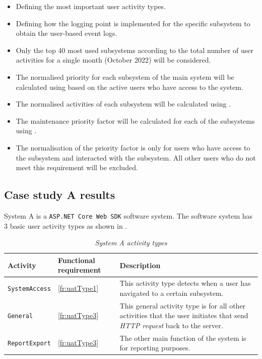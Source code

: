 \begin{itemize}
\item Defining the most important user activity types.
\item Defining how the logging point is implemented for the specific subsystem to obtain the user-based event logs.
\item Only the top 40 most used subsystems according to the total number of user activities for a single month (October 2022) will be considered.
\item The normalised priority for each subsystem of the main system will be calculated using  based on the active users who have access to the system.
\item The normalised activities of each subsystem will be calculated using .
\item The maintenance priority factor will be calculated for each of the subsystems using .
\item The normalisation of the priority factor is only for users who have access to the subsystem and interacted with the subsystem. All other users who do not meet this requirement will be excluded.
\end{itemize}

\subsection{Case study A results}
System A is a \texttt{ASP.NET Core Web SDK} software system. The software system has 3 basic user activity types as shown in .

\begin{table}[!htb]
	\centering
	\caption[System A activity types]{\textit{System A activity types}}
	\label{tbl:ch3_systemAActivityTypes}
	\begin{tabularx}{\textwidth}{|X|l|X|}
		\hline \textbf{Activity} & \textbf{Functional requirement} & \textbf{Description} \\
		\hline \texttt{SystemAccess} & \ref{fr:uatType1} & \RaggedRight This activity type detects when a user has navigated to a certain subsystem. \\ 
		\hline \texttt{General} & \ref{fr:uatType3} & \RaggedRight This general activity type is for all other activities that the user initiates that send \textit{HTTP request} back to the server.  \\
		\hline \texttt{ReportExport} & \ref{fr:uatType3} & \RaggedRight The other main function of the system is for reporting purposes. \\ 
		\hline
	\end{tabularx}
\end{table}

